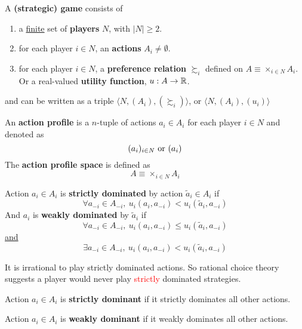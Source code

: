 \documentclass[11pt]{article}
\newcommand{\red}[1]{\textcolor{red}{#1}}
\begin{document}
		\begin{definition}[11.1, lec.1]
			A \textbf{(strategic) game} consists of
			\begin{enumerate}[i]
				\item a \ul{finite} set of \textbf{players} $N$, with $|N| \geq 2$.
				\item for each player $i \in N$, an \textbf{actions} $A_i \neq \emptyset$.
				\item for each player $i \in N$, a \textbf{preference relation} $\succsim_i$ defined on $A \equiv \times_{i\in N}A_i$. Or a real-valued \textbf{utility function}, $u: A \to \mathbb{R}$.
			\end{enumerate}
			and can be written as a triple $\langle N, (A_i), (\succsim_i) \rangle$, or $\langle N, (A_i), (u_i) \rangle$
		\end{definition}
		
		\begin{definition}[lec.1]
			An \textbf{action profile} is a $n$-tuple of actions $a_i \in A_i$ for each player $i \in N$ and denoted as 
				\[
					(a_i)_{i \in N} \text{{ or }} (a_i)
				\]
			The \textbf{action profile space} is defined as 
				\[
					A \equiv \times_{i \in N} A_i
				\]
		\end{definition}
		
		\begin{definition}[lec.1]
			Action $a_i \in A_i$ is \textbf{strictly dominated} by action $\tilde{a}_i \in A_i$ if
			\[
				\forall a_{-i} \in A_{-i},\ u_i(a_i, a_{-i}) < u_i(\tilde{a}_i, a_{-i})
			\]
			And $a_i$ is \textbf{weakly dominated} by $\tilde{a}_i$ if
			\[
				\forall a_{-i} \in A_{-i},\ u_i(a_i, a_{-i}) \leq u_i(\tilde{a}_i, a_{-i})
			\]
			\ul{and}
			\[
				\exists a_{-i} \in A_{-i},\ u_i(a_i, a_{-i}) < u_i(\tilde{a}_i, a_{-i})
			\]
		\end{definition}
		
		\begin{corollary}
			It is irrational to play strictly dominated actions. So rational choice theory suggests a player would never play \red{strictly} dominated strategies.
		\end{corollary}
		
		\begin{definition}
			Action $a_i \in A_i$ is \textbf{strictly dominant} if it strictly dominates all other actions.
		\end{definition}
		
		\begin{definition}
			Action $a_i \in A_i$ is \textbf{weakly dominant} if it weakly dominates all other actions.
		\end{definition}
		
\end{document}
